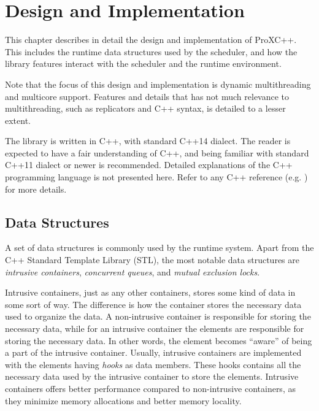 

\chapter{Design and Implementation}
\label{ch:design_implementation}

This chapter describes in detail the design and implementation of ProXC++. This includes the runtime data structures used by the scheduler, and how the library features interact with the scheduler and the runtime environment.

Note that the focus of this design and implementation is dynamic multithreading and multicore support. Features and details that has not much relevance to multithreading, such as replicators and C++ syntax, is detailed to a lesser extent.

The library is written in C++, with standard C++14 dialect. The reader is expected to have a fair understanding of C++, and being familiar with standard C++11 dialect or newer is recommended. Detailed explanations of the C++ programming language is not presented here. Refer to any C++ reference (e.g. \citet{stroustrup2013c++}) for more details.


\FloatBarrier
\section{Data Structures}


A set of data structures is commonly used by the runtime system. Apart from the C++ Standard Template Library (STL), the most notable data structures are \textit{intrusive containers}, \textit{concurrent queues}, and \textit{mutual exclusion locks}.

Intrusive containers, just as any other containers, stores some kind of data in some sort of way. The difference is how the container stores the necessary data used to organize the data. A non\hyp{}intrusive container is responsible for storing the necessary data, while for an intrusive container the elements are responsible for storing the necessary data. In other words, the element becomes ``aware'' of being a part of the intrusive container. Usually, intrusive containers are implemented with the elements having \textit{hooks} as data members. These hooks contains all the necessary data used by the intrusive container to store the elements. Intrusive containers offers better performance compared to non\hyp{}intrusive containers, as they minimize memory allocations and better memory locality.

